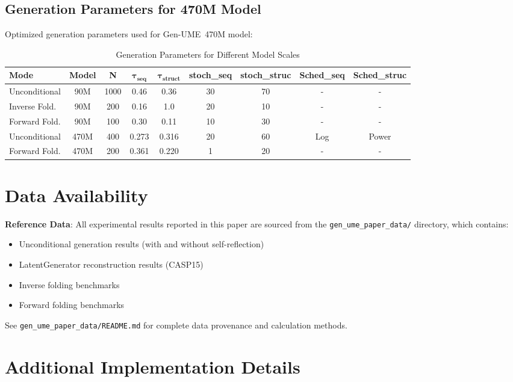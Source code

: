 \documentclass[11pt,a4paper]{article}
\newcommand{\genume}{Gen-UME}
\begin{document}
\subsection{Generation Parameters for 470M Model}

Optimized generation parameters used for \genume~470M model:

\begin{table}[h]
\centering
\small
\caption{Generation Parameters for Different Model Scales}
\begin{tabular}{@{}lcccccccc@{}}
\toprule
\textbf{Mode} & \textbf{Model} & \textbf{N} & $\boldsymbol{\tau_{\text{seq}}}$ & $\boldsymbol{\tau_{\text{struct}}}$ & \textbf{stoch\_seq} & \textbf{stoch\_struc} & \textbf{Sched\_seq} & \textbf{Sched\_struc} \\
\midrule
Unconditional & 90M & 1000 & 0.46 & 0.36 & 30 & 70 & - & - \\
Inverse Fold. & 90M & 200 & 0.16 & 1.0 & 20 & 10 & - & - \\
Forward Fold. & 90M & 100 & 0.30 & 0.11 & 10 & 30 & - & - \\
\midrule
Unconditional & 470M & 400 & 0.273 & 0.316 & 20 & 60 & Log & Power \\
Forward Fold. & 470M & 200 & 0.361 & 0.220 & 1 & 20 & - & - \\
\bottomrule
\end{tabular}
\label{tab:gen_params_470m}
\end{table}

\section{Data Availability}

\textbf{Reference Data}: All experimental results reported in this paper are sourced from the \texttt{gen\_ume\_paper\_data/} directory, which contains:
\begin{itemize}
\item Unconditional generation results (with and without self-reflection)
\item LatentGenerator reconstruction results (CASP15)
\item Inverse folding benchmarks
\item Forward folding benchmarks
\end{itemize}

See \texttt{gen\_ume\_paper\_data/README.md} for complete data provenance and calculation methods.

\section{Additional Implementation Details}
\end{document}

